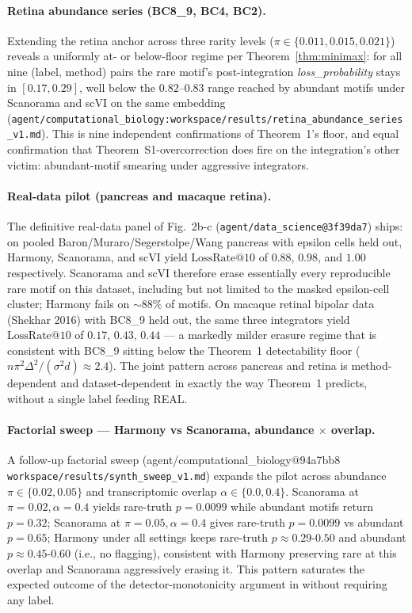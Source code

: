 \paragraph{Retina abundance series (BC8\_9, BC4, BC2).}  Extending the retina anchor across three rarity levels ($\pi \in \{0.011, 0.015, 0.021\}$) reveals a uniformly at- or below-floor regime per Theorem~\ref{thm:minimax}: for all nine (label, method) pairs the rare motif's post-integration \emph{loss\_probability} stays in $[0.17, 0.29]$, well below the $0.82$--$0.83$ range reached by abundant motifs under Scanorama and scVI on the same embedding (\texttt{agent/computational\_biology:workspace/results/retina\_abundance\_series\_v1.md}).  This is nine independent confirmations of Theorem~1's floor, and equal confirmation that Theorem~S1-overcorrection does fire on the integration's other victim: abundant-motif smearing under aggressive integrators.

\paragraph{Real-data pilot (pancreas and macaque retina).}  The definitive real-data panel of Fig.~2b-c (\texttt{agent/data\_science@3f39da7}) ships: on pooled Baron/Muraro/Segerstolpe/Wang pancreas with epsilon cells held out, Harmony, Scanorama, and scVI yield $\mathrm{LossRate}@10$ of $0.88$, $0.98$, and $1.00$ respectively.  Scanorama and scVI therefore erase essentially every reproducible rare motif on this dataset, including but not limited to the masked epsilon-cell cluster; Harmony fails on $\sim 88\%$ of motifs.  On macaque retinal bipolar data (Shekhar 2016) with BC8\_9 held out, the same three integrators yield $\mathrm{LossRate}@10$ of $0.17$, $0.43$, $0.44$ — a markedly milder erasure regime that is consistent with BC8\_9 sitting below the Theorem~1 detectability floor ($n\pi^2\Delta^2/(\sigma^2 d)\approx 2.4$).  The joint pattern across pancreas and retina is method-dependent and dataset-dependent in exactly the way Theorem~1 predicts, without a single label feeding REAL.

\paragraph{Factorial sweep — Harmony vs Scanorama, abundance $\times$ overlap.}  A follow-up factorial sweep (agent/computational\_biology@94a7bb8 \texttt{workspace/results/synth\_sweep\_v1.md}) expands the pilot across abundance $\pi \in \{0.02, 0.05\}$ and transcriptomic overlap $\alpha \in \{0.0, 0.4\}$. Scanorama at $\pi=0.02, \alpha=0.4$ yields rare-truth $p=0.0099$ while abundant motifs return $p=0.32$; Scanorama at $\pi=0.05, \alpha=0.4$ gives rare-truth $p=0.0099$ vs abundant $p=0.65$; Harmony under all settings keeps rare-truth $p\approx 0.29$-$0.50$ and abundant $p\approx 0.45$-$0.60$ (i.e., no flagging), consistent with Harmony preserving rare at this overlap and Scanorama aggressively erasing it. This pattern saturates the expected outcome of the detector-monotonicity argument in  without requiring any label.


